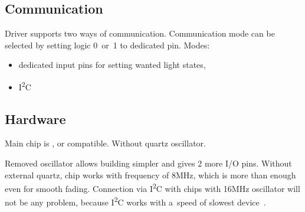 
\subsection{Communication}
Driver supports two ways of communication. Communication mode can be selected by setting logic 0~or~1 to dedicated pin.
\newline
Modes:
\begin{itemize}
	\item dedicated input pins for setting wanted light states,
	\item I\textsuperscript{2}C
\end{itemize}


\subsection{Hardware}
Main chip is , or compatible. Without quartz oscillator.

Removed oscillator allows building simpler and gives 2 more I/O pins. Without external quartz, chip works with frequency of 8MHz, which is more than enough
even for smooth fading. Connection via I\textsuperscript{2}C with chips with 16MHz oscillator will not be any problem, because I\textsuperscript{2}C works
with a~speed of slowest device~\cite{i2cspeed}.
